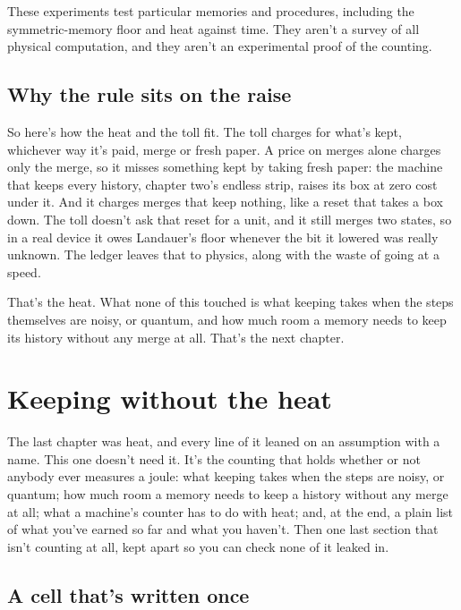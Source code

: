 \documentclass[11pt,twoside]{article}
\theoremstyle{thielethm}
\theoremstyle{thieledef}
\theoremstyle{thieledef}
\theoremstyle{thieledef}
\theoremstyle{thielethm}
\theoremstyle{thieleobs}
\theoremstyle{thielethm}
\begin{document}
These experiments test particular memories and procedures, including the symmetric-memory floor and heat against time. They aren't a survey of all physical computation, and they aren't an experimental proof of the counting.

\subsection{Why the rule sits on the raise}

So here's how the heat and the toll fit. The toll charges for what's kept, whichever way it's paid, merge or fresh paper. A price on merges alone charges only the merge, so it misses something kept by taking fresh paper: the machine that keeps every history, chapter two's endless strip, raises its box at zero cost under it. And it charges merges that keep nothing, like a reset that takes a box down. The toll doesn't ask that reset for a unit, and it still merges two states, so in a real device it owes Landauer's floor whenever the bit it lowered was really unknown. The ledger leaves that to physics, along with the waste of going at a speed.

That's the heat. What none of this touched is what keeping takes when the steps themselves are noisy, or quantum, and how much room a memory needs to keep its history without any merge at all. That's the next chapter.

\section{Keeping without the heat}
\label{sec:keeping}

The last chapter was heat, and every line of it leaned on an assumption with a name. This one doesn't need it. It's the counting that holds whether or not anybody ever measures a joule: what keeping takes when the steps are noisy, or quantum; how much room a memory needs to keep a history without any merge at all; what a machine's counter has to do with heat; and, at the end, a plain list of what you've earned so far and what you haven't. Then one last section that isn't counting at all, kept apart so you can check none of it leaked in.

\subsection{A cell that's written once}
\end{document}
